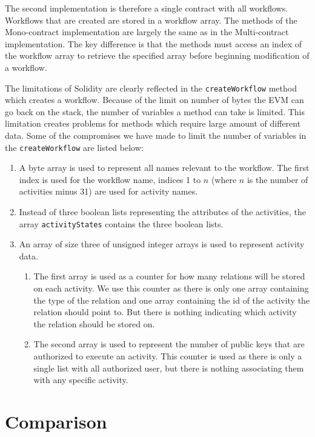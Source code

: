 \documentclass{article}
\begin{document}
	The second implementation is therefore a single contract with all workflows. 
	Workflows that are created are stored in a workflow array. 
	The methods of the Mono-contract implementation are largely the same as in the Multi-contract implementation. 
	The key difference is that the methods must access an index of the workflow array to retrieve the specified array before beginning modification of a workflow.

	The limitations of Solidity are clearly reflected in the \texttt{createWorkflow} method which creates a workflow. 
	Because of the limit on number of bytes the EVM can go back on the stack, the number of variables a method can take is limited. 
	This limitation creates problems for methods which require large amount of different data. 
	Some of the compromises we have made to limit the number of variables in the \texttt{createWorkflow} are listed below:
	\begin{enumerate}
		\item A byte array is used to represent all names relevant to the workflow. The first index is used for the workflow name, indices 1 to $n$ (where $n$ is the number of activities minus 31) are used for activity names.
		\item Instead of three boolean lists representing the attributes of the activities, the array \texttt{activityStates} contains the three boolean lists.
		\item An array of size three of unsigned integer arrays is used to represent activity data. 
		\begin{enumerate}
			\item The first array is used as a counter for how many relations will be stored on each activity. We use this counter as there is only one array containing the type of the relation and one array containing the id of the activity the relation should point to. But there is nothing indicating which activity the relation should be stored on.
			\item The second array is used to represent the number of public keys that are authorized to execute an activity. This counter is used as there is only a single list with all authorized user, but there is nothing associating them with any specific activity.
		\end{enumerate}
	\end{enumerate}

	\section{Comparison}
	\label{sec:comparison}
\end{document}
